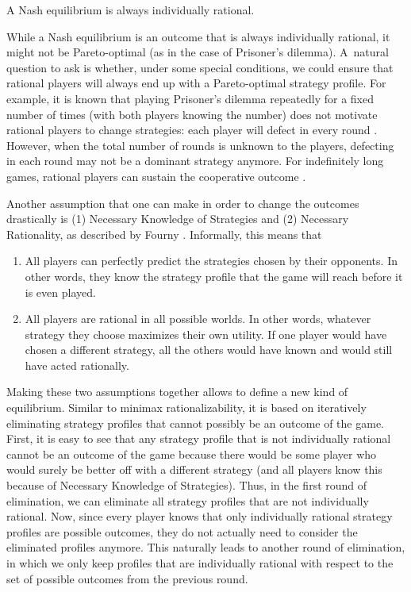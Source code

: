 \begin{observation}
  A Nash equilibrium is always individually rational.
\end{observation}

While a Nash equilibrium is an outcome that is always individually rational, it might not be Pareto-optimal (as in the case of Prisoner's dilemma).
A~natural question to ask is whether, under some special conditions, we could ensure that rational players will always end up with a Pareto-optimal strategy profile.
For example, it is known that playing Prisoner's dilemma repeatedly for a fixed number of times (with both players knowing the number) does not motivate rational players to change strategies: each player will defect in every round \cite{Cressman96}.
However, when the total number of rounds is unknown to the players, defecting in each round may not be a dominant strategy anymore.
For indefinitely long games, rational players can sustain the cooperative outcome \cite{Rasmusen1992}.

Another assumption that one can make in order to change the outcomes drastically is (1) Necessary Knowledge of Strategies and (2) Necessary Rationality, as described by Fourny \cite{Fourny20}.
Informally, this means that
\begin{enumerate}[label=(\arabic*)]
  \item All players can perfectly predict the strategies chosen by their opponents.
  In other words, they know the strategy profile that the game will reach before it is even played.
  \item All players are rational in all possible worlds.
  In other words, whatever strategy they choose maximizes their own utility.
  If one player would have chosen a different strategy, all the others would have known and would still have acted rationally.
\end{enumerate}
Making these two assumptions together allows to define a new kind of equilibrium.
Similar to minimax rationalizability, it is based on iteratively eliminating strategy profiles that cannot possibly be an outcome of the game.
First, it is easy to see that any strategy profile that is not individually rational cannot be an outcome of the game because there would be some player who would surely be better off with a different strategy (and all players know this because of Necessary Knowledge of Strategies).
Thus, in the first round of elimination, we can eliminate all strategy profiles that are not individually rational.
Now, since every player knows that only individually rational strategy profiles are possible outcomes, they do not actually need to consider the eliminated profiles anymore.
This naturally leads to another round of elimination, in which we only keep profiles that are individually rational with respect to the set of possible outcomes from the previous round.

